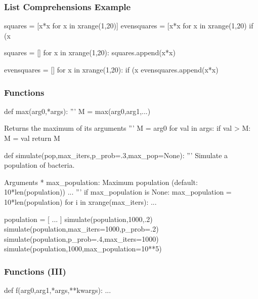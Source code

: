 \begin{frame}[fragile]
\frametitle{List Comprehensions Example}

\begin{python}
squares = [x*x for x in xrange(1,20)]
evensquares = [x*x for x in xrange(1,20) if (x%
\end{python}

\begin{python}
squares = []
for x in xrange(1,20):
    squares.append(x*x)

evensquares = []
for x in xrange(1,20):
    if (x%
        evensquares.append(x*x)
\end{python}

\end{frame}

\begin{frame}[fragile]
\frametitle{Functions}

\begin{python}
def max(arg0,*args):
    '''
    M = max(arg0,arg1,...)

    Returns the maximum of its arguments
    '''
    M = arg0
    for val in args:
        if val > M:
            M = val
    return M
\end{python}

\end{frame}

\begin{frame}[fragile]
\begin{python}
def simulate(pop,max_iters,p_prob=.3,max_pop=None):
    '''
    Simulate a population of bacteria.

    Arguments
        * max_population: Maximum population
                        (default: 10*len(population))
        ...
    '''
    if max_population is None:
        max_population = 10*len(population)
    for i in xrange(max_iters):
        ...

population = [ ... ]
simulate(population,1000,.2)
simulate(population,max_iters=1000,p_prob=.2)
simulate(population,p_prob=.4,max_iters=1000)
simulate(population,1000,max_population=10**5)
\end{python}
\end{frame}

\begin{frame}[fragile]
\frametitle{Functions (III)}

\begin{python}
def f(arg0,arg1,*args,**kwargs):
    ...
\end{python}
\end{frame}

